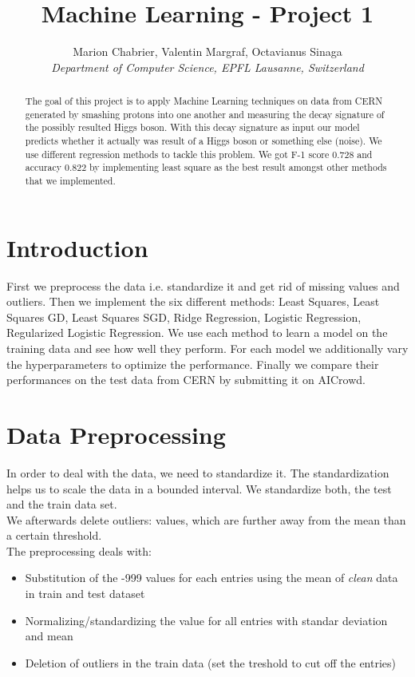 \documentclass[10pt,conference,compsocconf]{IEEEtran}
\begin{document}
\title{Machine Learning - Project 1}

\author{
  Marion Chabrier, Valentin Margraf, Octavianus Sinaga\\
  \textit{Department of Computer Science, EPFL Lausanne, Switzerland}
}

\maketitle

\begin{abstract}
The goal of this project is to apply Machine Learning techniques on data from CERN generated by smashing protons into one another and measuring the decay signature of the possibly resulted Higgs boson. With this decay signature as input our model predicts whether it actually was result of a Higgs boson or something else (noise). We use different regression methods to tackle this problem. We got F-1 score 0.728 and accuracy 0.822 by implementing least square as the best result amongst other methods that we implemented.
\end{abstract}

\section{Introduction}
First we preprocess the data i.e. standardize it and get rid of missing values and outliers.
Then we implement the six different methods: Least Squares, Least Squares GD, Least Squares SGD, Ridge Regression, Logistic Regression, Regularized Logistic Regression. We use each method to learn a model on the training data and see how well they perform. For each model we additionally vary the hyperparameters to optimize the performance. Finally we compare their performances on the test data from CERN by submitting it on AICrowd.



\section{Data Preprocessing}
\label{sec:prepro}
In order to deal with the data, we need to standardize it. The standardization helps us to scale the data in a bounded interval. We standardize both, the test and the train data set. \\
We afterwards delete outliers: values, which are further away from the mean than a certain threshold. 
\\
The preprocessing deals with:
\begin{itemize}
	\item Substitution of the -999 values for each entries using the mean of \textit{clean} data in train and test dataset
	\item Normalizing/standardizing the value for all entries with standar deviation and mean
	\item Deletion of outliers in the train data (set the treshold to cut off the entries)
\end{itemize}
\end{document}
